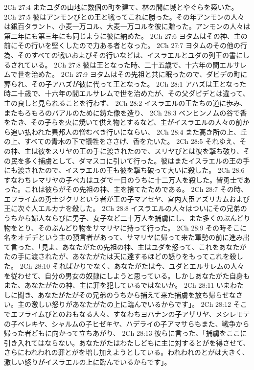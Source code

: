 2Ch 27:4  またユダの山地に数個の町を建て、林の間に城とやぐらを築いた。
2Ch 27:5  彼はアンモンびとの王と戦ってこれに勝った。その年アンモンの人々は銀百タラント、小麦一万コル、大麦一万コルを彼に贈った。アンモンの人々は第二年にも第三年にも同じように彼に納めた。
2Ch 27:6  ヨタムはその神、主の前にその行いを堅くしたので力ある者となった。
2Ch 27:7  ヨタムのその他の行為、そのすべての戦いおよびその行いなどは、イスラエルとユダの列王の書にしるされている。
2Ch 27:8  彼は王となった時、二十五歳で、十六年の間エルサレムで世を治めた。
2Ch 27:9  ヨタムはその先祖と共に眠ったので、ダビデの町に葬られ、その子アハズが彼に代って王となった。
2Ch 28:1  アハズは王となった時二十歳で、十六年の間エルサレムで世を治めたが、その父ダビデとは違って、主の良しと見られることを行わず、
2Ch 28:2  イスラエルの王たちの道に歩み、またもろもろのバアルのために鋳た像を造り、
2Ch 28:3  ベンヒンノムの谷で香をたき、その子らを火に焼いて供え物とするなど、主がイスラエルの人々の前から追い払われた異邦人の憎むべき行いにならい、
2Ch 28:4  また高き所の上、丘の上、すべての青木の下で犠牲をささげ、香をたいた。
2Ch 28:5  それゆえ、その神、主は彼をスリヤの王の手に渡されたので、スリヤびとは彼を撃ち破り、その民を多く捕虜として、ダマスコに引いて行った。彼はまたイスラエルの王の手にも渡されたので、イスラエルの王も彼を撃ち破って大いに殺した。
2Ch 28:6  すなわちレマリヤの子ペカはユダで一日のうちに十二万人を殺した。皆勇士であった。これは彼らがその先祖の神、主を捨てたためである。
2Ch 28:7  その時、エフライムの勇士ジクリという者が王の子マアセヤ、宮内大臣アズリカムおよび王に次ぐ人エルカナを殺した。
2Ch 28:8  イスラエルの人々はついにその兄弟のうちから婦人ならびに男子、女子など二十万人を捕虜にし、また多くのぶんどり物をとり、そのぶんどり物をサマリヤに持って行った。
2Ch 28:9  その時そこに名をオデデという主の預言者があって、サマリヤに帰って来た軍勢の前に進み出て言った、「見よ、あなたがたの先祖の神、主はユダを怒って、これをあなたがたの手に渡されたが、あなたがたは天に達するほどの怒りをもってこれを殺した。
2Ch 28:10  そればかりでなく、あなたがたは今、ユダとエルサレムの人々を従わせて、自分の男女の奴隷にしようと思っている。しかしあなたがた自身もまた、あなたがたの神、主に罪を犯しているではないか。
2Ch 28:11  いまわたしに聞き、あなたがたがその兄弟のうちから捕えて来た捕虜を放ち帰らせなさい。主の激しい怒りがあなたがたの上に臨んでいるからです」。
2Ch 28:12  そこでエフライムびとのおもなる人々、すなわちヨハナンの子アザリヤ、メシレモテの子ベレキヤ、シャルムの子ヒゼキヤ、ハデライの子アマサらもまた、戦争から帰った者どもに向かって立ちあがり、
2Ch 28:13  彼らに言った、「捕虜をここに引き入れてはならない。あなたがたはわたしどもに主に対するとがを得させて、さらにわれわれの罪とがを増し加えようとしている。われわれのとがは大きく、激しい怒りがイスラエルの上に臨んでいるからです」。
